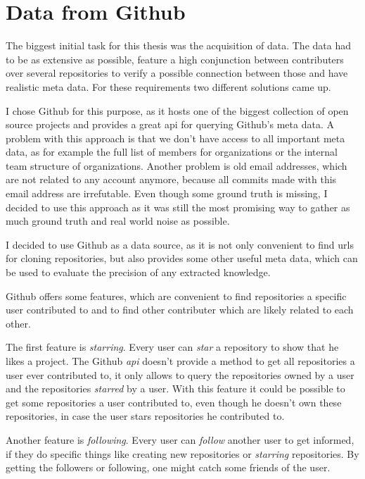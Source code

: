 \chapter{Data from Github}\label{github}
The biggest initial task for this thesis was the acquisition of data.
The data had to be as extensive as possible, feature a high conjunction between contributers over several repositories to verify a possible connection between those and have realistic meta data.
For these requirements two different solutions came up.


I chose Github for this purpose, as it hosts one of the biggest collection of open source projects and provides a great \ac{api} for querying Github's meta data.
A problem with this approach is that we don't have access to all important meta data, as for example the full list of members for organizations or the internal team structure of organizations.
Another problem is old email addresses, which are not related to any account anymore, because all commits made with this email address are irrefutable.
Even though some ground truth is missing, I decided to use this approach as it was still the most promising way to gather as much ground truth and real world noise as possible.


I decided to use Github as a data source, as it is not only convenient to find \acp{url} for cloning repositories, but also provides some other useful meta data, which can be used to evaluate the precision of any extracted knowledge.

Github offers some features, which are convenient to find repositories a specific user contributed to and to find other contributer which are likely related to each other.

The first feature is \emph{starring}. Every user can \emph{star} a repository to show that he likes a project.
The Github \emph{api} doesn't provide a method to get all repositories a user ever contributed to, it only allows to query the repositories owned by a user and the repositories \emph{starred} by a user.
With this feature it could be possible to get some repositories a user contributed to, even though he doesn't own these repositories, in case the user stars repositories he contributed to.

Another feature is \emph{following}. Every user can \emph{follow} another user to get informed, if they do specific things like creating new repositories or \emph{starring} repositories.
By getting the followers or following, one might catch some friends of the user.

